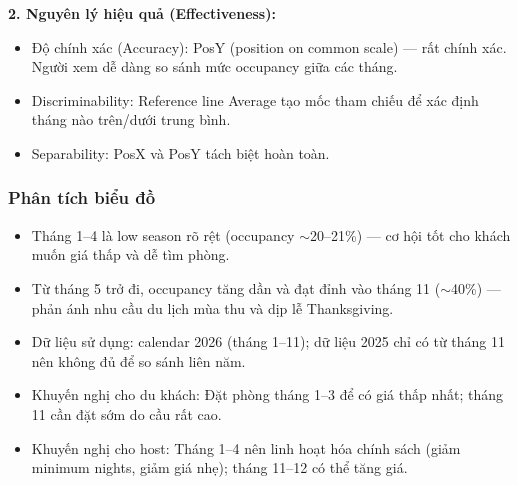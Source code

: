 \textbf{2. Nguyên lý hiệu quả (Effectiveness):}

\begin{itemize}
    \item Độ chính xác (Accuracy): PosY (position on common scale) --- rất chính xác. Người xem dễ dàng so sánh mức occupancy giữa các tháng.
    \item Discriminability: Reference line Average tạo mốc tham chiếu để xác định tháng nào trên/dưới trung bình.
    \item Separability: PosX và PosY tách biệt hoàn toàn.
\end{itemize}

\subsubsection{Phân tích biểu đồ}

\begin{itemize}
    \item Tháng 1--4 là low season rõ rệt (occupancy $\sim$20--21\%) --- cơ hội tốt cho khách muốn giá thấp và dễ tìm phòng.
    \item Từ tháng 5 trở đi, occupancy tăng dần và đạt đỉnh vào tháng 11 ($\sim$40\%) --- phản ánh nhu cầu du lịch mùa thu và dịp lễ Thanksgiving.
    \item Dữ liệu sử dụng: calendar 2026 (tháng 1--11); dữ liệu 2025 chỉ có từ tháng 11 nên không đủ để so sánh liên năm.
    \item Khuyến nghị cho du khách: Đặt phòng tháng 1--3 để có giá thấp nhất; tháng 11 cần đặt sớm do cầu rất cao.
    \item Khuyến nghị cho host: Tháng 1--4 nên linh hoạt hóa chính sách (giảm minimum nights, giảm giá nhẹ); tháng 11--12 có thể tăng giá.
\end{itemize}
